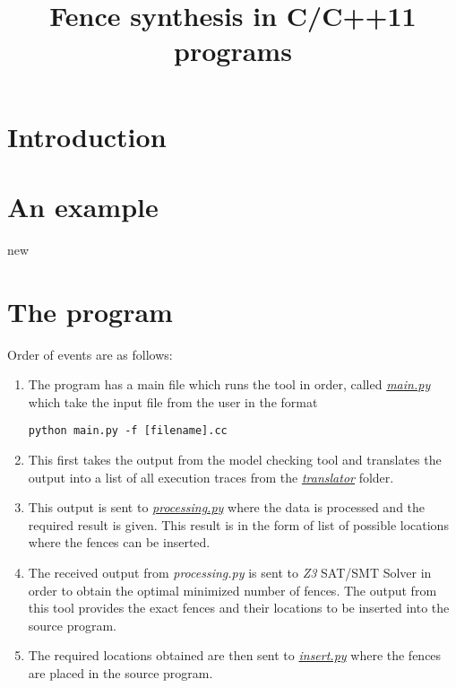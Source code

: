\documentclass{article}
\date{}
\begin{document}
\title{Fence synthesis in C/C++11 programs}
\maketitle 

\section{Introduction} \label{sec:intro}


\section{An example}
\par
new

\section{The program}
\par
Order of events are as follows:
\begin{enumerate}
    \item The program has a main file which runs the tool in order, called \href{mainpy.tex}{\textit{main.py}} which take the input file from the user in the format \begin{center} \texttt{python main.py -f [filename].cc} \end{center} 
    
    \item This first takes the output from the model checking tool and translates the output into a list of all execution traces from the \href{translator.tex}{\textit{translator}} folder.
    
    \item This output is sent to \href{processing.tex}{\textit{processing.py}} where the data is processed and the required result is given. This result is in the form of list of possible locations where the fences can be inserted.
    
    \item The received output from \textit{processing.py} is sent to \textit{Z3} SAT/SMT Solver in order to obtain the optimal minimized number of fences. The output from this tool provides the exact fences and their locations to be inserted into the source program.
    
    \item The required locations obtained are then sent to \href{insert.tex}{\textit{insert.py}} where the fences are placed in the source program.
    
\end{enumerate}
\end{document}
